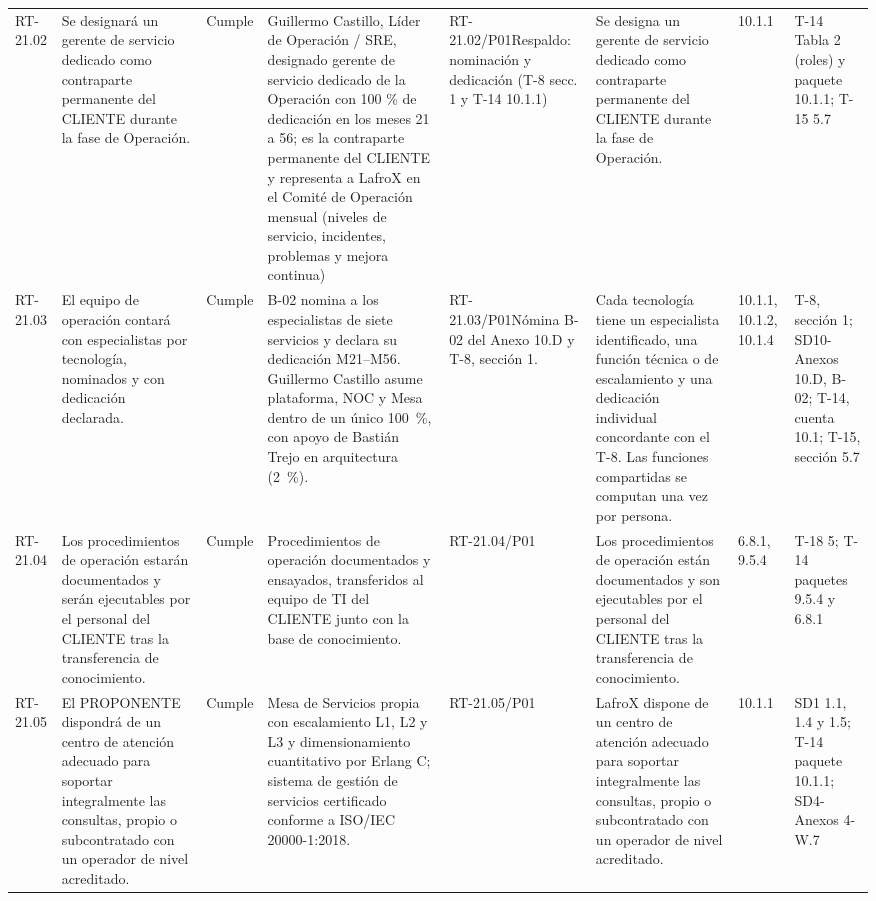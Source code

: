 \documentclass[oficio,firma,final]{lafrox}
\begin{document}
\begin{landscape}
{\begin{longtable}{@{}F{0.054} F{0.173} F{0.061} F{0.191} F{0.106} F{0.180} F{0.067} F{0.168}@{}}
  RT-21.02 & Se designará un gerente de servicio dedicado como contraparte permanente del CLIENTE durante la fase de Operación. & Cumple & Guillermo Castillo, Líder de Operación / SRE, designado gerente de servicio dedicado de la Operación con 100 \% de dedicación en los meses 21 a 56; es la contraparte permanente del CLIENTE y representa a LafroX en el Comité de Operación mensual (niveles de servicio, incidentes, problemas y mejora continua) & RT-21.02/\allowbreak{}P01\newline Respaldo: nominación y dedicación (T-8 secc. 1 y T-14 10.1.1) & Se designa un gerente de servicio dedicado como contraparte permanente del CLIENTE durante la fase de Operación. & 10.1.1 & T-14 Tabla 2 (roles) y paquete 10.1.1; T-15 5.7  \\
  RT-21.03 & El equipo de operación contará con especialistas por tecnología, nominados y con dedicación declarada. & Cumple & B-02 nomina a los especialistas de siete servicios y declara su dedicación M21--M56. Guillermo Castillo asume plataforma, NOC y Mesa dentro de un único 100~\%, con apoyo de Bastián Trejo en arquitectura (2~\%). & RT-21.03/\allowbreak{}P01\newline Nómina B-02 del Anexo 10.D y T-8, sección 1. & Cada tecnología tiene un especialista identificado, una función técnica o de escalamiento y una dedicación individual concordante con el T-8. Las funciones compartidas se computan una vez por persona. & 10.1.1, 10.1.2, 10.1.4 & T-8, sección 1; SD10-Anexos 10.D, B-02; T-14, cuenta 10.1; T-15, sección 5.7  \\
  RT-21.04 & Los procedimientos de operación estarán documentados y serán ejecutables por el personal del CLIENTE tras la transferencia de conocimiento. & Cumple & Procedimientos de operación documentados y ensayados, transferidos al equipo de TI del CLIENTE junto con la base de conocimiento. & RT-21.04/\allowbreak{}P01 & Los procedimientos de operación están documentados y son ejecutables por el personal del CLIENTE tras la transferencia de conocimiento. & 6.8.1, 9.5.4 & T-18 5; T-14 paquetes 9.5.4 y 6.8.1  \\
  RT-21.05 & El PROPONENTE dispondrá de un centro de atención adecuado para soportar integralmente las consultas, propio o subcontratado con un operador de nivel acreditado. & Cumple & Mesa de Servicios propia con escalamiento L1, L2 y L3 y dimensionamiento cuantitativo por Erlang C; sistema de gestión de servicios certificado conforme a ISO/IEC 20000-1:2018. & RT-21.05/\allowbreak{}P01 & LafroX dispone de un centro de atención adecuado para soportar integralmente las consultas, propio o subcontratado con un operador de nivel acreditado. & 10.1.1 & SD1 1.1, 1.4 y 1.5; T-14 paquete 10.1.1; SD4-Anexos 4-W.7  \\

\end{longtable}}
\end{landscape}
\end{document}
